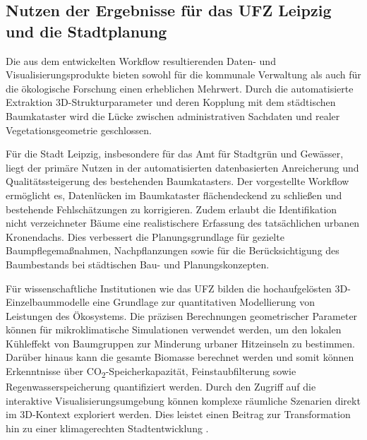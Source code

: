 \subsection{Nutzen der Ergebnisse für das UFZ Leipzig und die Stadtplanung}

Die aus dem entwickelten Workflow resultierenden Daten- und Visualisierungsprodukte bieten sowohl für die kommunale Verwaltung als auch für die ökologische Forschung einen erheblichen Mehrwert. Durch die automatisierte Extraktion 3D-Strukturparameter und deren Kopplung mit dem städtischen Baumkataster wird die Lücke zwischen administrativen Sachdaten und realer Vegetationsgeometrie geschlossen.

Für die Stadt Leipzig, insbesondere für das Amt für Stadtgrün und Gewässer, liegt der primäre Nutzen in der automatisierten datenbasierten Anreicherung und Qualitätssteigerung des bestehenden Baumkatasters. Der vorgestellte Workflow ermöglicht es, Datenlücken im Baumkataster flächendeckend zu schließen und bestehende Fehlschätzungen zu korrigieren. Zudem erlaubt die Identifikation nicht verzeichneter Bäume eine realistischere Erfassung des tatsächlichen urbanen Kronendachs. Dies verbessert die Planungsgrundlage für gezielte Baumpflegemaßnahmen, Nachpflanzungen sowie für die Berücksichtigung des Baumbestands bei städtischen Bau- und Planungskonzepten.

Für wissenschaftliche Institutionen wie das UFZ bilden die hochaufgelösten 3D-Einzelbaummodelle eine Grundlage zur quantitativen Modellierung von Leistungen des Ökosystems. Die präzisen Berechnungen geometrischer Parameter können für mikroklimatische Simulationen verwendet werden, um den lokalen Kühleffekt von Baumgruppen zur Minderung urbaner Hitzeinseln zu bestimmen. Darüber hinaus kann die gesamte Biomasse berechnet werden und somit können Erkenntnisse über  CO\textsubscript{2}-Speicherkapazität, Feinstaubfilterung sowie Regenwasserspeicherung quantifiziert werden. Durch den Zugriff auf die interaktive Visualisierungsumgebung können komplexe räumliche Szenarien direkt im 3D-Kontext exploriert werden. Dies leistet einen Beitrag zur Transformation hin zu einer klimagerechten Stadtentwicklung \cite{munzingerMappingUrbanForest2022}.